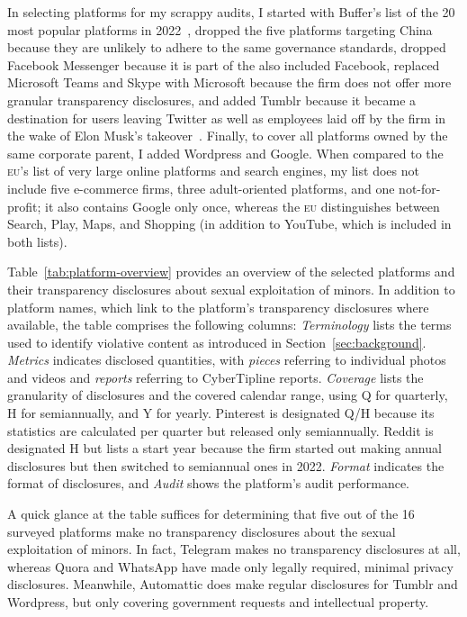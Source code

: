\documentclass[nonacm,screen]{acmart}
\newcommand\V[1]{\textsc{\MakeLowercase{#1}}}
\begin{document}
In selecting platforms for my scrappy audits, I started with Buffer's list of
the 20 most popular platforms in 2022~\cite{Lua2022}, dropped the five platforms
targeting China because they are unlikely to adhere to the same governance
standards, dropped Facebook Messenger because it is part of the also included
Facebook, replaced Microsoft Teams and Skype with Microsoft because the firm
does not offer more granular transparency disclosures, and added Tumblr because
it became a destination for users leaving Twitter as well as employees laid off
by the firm in the wake of Elon Musk's takeover~\cite{Patel2022}. Finally, to
cover all platforms owned by the same corporate parent, I added Wordpress and
Google. When compared to the \V{EU}'s list of very large online platforms and
search engines, my list does not include five e-commerce firms, three
adult-oriented platforms, and one not-for-profit; it also contains Google only
once, whereas the \V{EU} distinguishes between Search, Play, Maps, and Shopping
(in addition to YouTube, which is included in both lists).

Table~\ref{tab:platform-overview} provides an overview of the selected platforms
and their transparency disclosures about sexual exploitation of minors. In
addition to platform names, which link to the platform's transparency
disclosures where available, the table comprises the following columns:
\emph{Terminology} lists the terms used to identify violative content as
introduced in Section~\ref{sec:background}. \emph{Metrics} indicates disclosed
quantities, with \emph{pieces} referring to individual photos and videos and
\emph{reports} referring to CyberTipline reports. \emph{Coverage} lists the
granularity of disclosures and the covered calendar range, using Q for
quarterly, H for semiannually, and Y for yearly. Pinterest is designated Q/H
because its statistics are calculated per quarter but released only
semiannually. Reddit is designated H but lists a start year because the firm
started out making annual disclosures but then switched to semiannual ones in
2022. \emph{Format} indicates the format of disclosures, and \emph{Audit} shows
the platform's audit performance.

A quick glance at the table suffices for determining that five out of the 16
surveyed platforms make no transparency disclosures about the sexual
exploitation of minors. In fact, Telegram makes no transparency disclosures at
all, whereas Quora and WhatsApp have made only legally required, minimal privacy
disclosures. Meanwhile, Automattic does make regular disclosures for Tumblr and
Wordpress, but only covering government requests and intellectual property.
\end{document}
